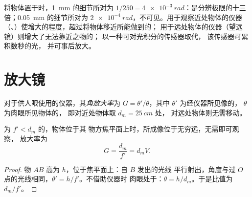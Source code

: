 \begin{remark}[仪器的用途]\label{rem:b1:optical-instruments:purpose}
将物体置于时，\qty{1}{mm} 的细节所对为 $1/250 =
\qty{4e-3}{rad}$：是分辨极限的十三倍；\qty{0.05}{mm}
的细节所对为 $\qty{2e-4}{rad}$，不可见。用于观察近处物体的仪器
（、）使增大的程度，超过将物体移近所能做到的；
用于远处物体的仪器（望远镜）则增大了无法靠近之物的；
以一种可对光积分的传感器取代，
该传感器可累积数秒的光，
并可事后放大。
\end{remark}

\section{放大镜}

\begin{definition}[角放大率]\label{def:b1:optical-instruments:G}
对于供人眼使用的仪器，其\emph{角放大率}为
$G = \theta'/\theta$，其中 $\theta'$ 为经仪器所见像的，
$\theta$ 为肉眼所见物体的，
即对近处物体取 $d_m = \qty{25}{cm}$ 处，
对远处物体则无需移动。
\end{definition}

\begin{proposition}[放大镜]\label{prop:b1:optical-instruments:loupe}
为 $f' < d_m$ 的，物体位于其
物方焦平面上时，所成像位于无穷远，无需即可观察，
放大率为
\[
G = \frac{d_m}{f'} = d_m V .
\]
\end{proposition}

\begin{proof}
物 $AB$ 高为 $h$，位于焦平面上：自 $B$ 发出的光线
平行射出，角度与过 $O$ 点的光线相同，$\theta' = h/f'$。不借助仪器时
肉眼处于：$\theta = h/d_m$。于是比值为 $d_m/f'$。
\end{proof}

